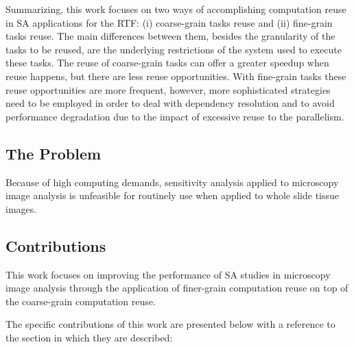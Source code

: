 
Summarizing, this work focuses on two ways of accomplishing computation reuse in SA applications for the RTF: (i) coarse-grain tasks reuse and (ii) fine-grain tasks reuse. The main differences between them, besides the granularity of the tasks to be reused, are the underlying restrictions of the system used to execute these tasks. The reuse of coarse-grain tasks can offer a greater speedup when reuse happens, but there are less reuse opportunities. With fine-grain tasks these reuse opportunities are more frequent, however, more sophisticated strategies need to be employed in order to deal with dependency resolution and to avoid performance degradation due to the impact of excessive reuse to the parallelism.


\subsection{The Problem}

Because of high computing demands, sensitivity analysis applied to microscopy image analysis is unfeasible for routinely use when applied to whole slide tissue images.

\subsection{Contributions}

This work focuses on improving the performance of SA studies in microscopy image analysis through the application of finer-grain computation reuse on top of the coarse-grain computation reuse.



The specific contributions of this work are presented below with a reference to the section in which they are described:

